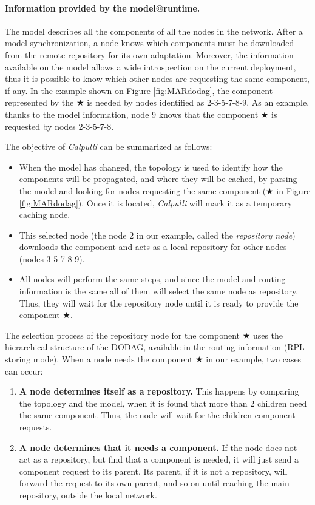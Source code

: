 \paragraph{Information provided by the model@runtime.} The model describes all the components of all the nodes in the network.
After a model synchronization, a node knows which components must be downloaded from the remote repository for its own adaptation.
Moreover, the information available on the model allows a wide introspection on the current deployment, thus it is possible to know which other nodes are requesting the same component, if any.
In the example shown on Figure \ref{fig:MARdodag}, the component represented by the $\bigstar$ is needed by nodes identified as 2-3-5-7-8-9. 
As an example, thanks to the model information, node 9 knows that the component $\bigstar$ is requested by nodes 2-3-5-7-8.

The objective of \emph{Calpulli} can be summarized as follows:
\begin{itemize}
	\item When the model has changed, the topology is used to identify how the components will be propagated, and where they will be cached, by parsing the model and looking for nodes requesting the same component ($\bigstar$ in Figure \ref{fig:MARdodag}).
	Once it is located, \textit{Calpulli} will mark it as a temporary caching node.
	\item This selected node (the node 2 in our example, called the \emph{repository node}) downloads the component and acts as a local repository for other nodes (nodes 3-5-7-8-9).
	\item All nodes will perform the same steps, and since the model and routing information is the same all of them will select the same node as repository.
	Thus, they will wait for the repository node until it is ready to provide the component $\bigstar$.
\end{itemize}

The selection process of the repository node for the component $\bigstar$ uses the hierarchical structure of the DODAG, available in the routing information (RPL storing mode). 
When a node needs the component $\bigstar$ in our example, two cases can occur:

\begin{enumerate}
	\item \textbf{A node determines itself as a repository.} This happens by comparing the topology and the model, when it is found that more than 2 children need the same component.
	Thus, the node will wait for the children component requests.
	\item \textbf{A node determines that it needs a component.} If the node does not act as a repository, but find that a component is needed, it will just send a component request to its parent. Its parent, if it is not a repository, will forward the request to its own parent, and so on until reaching the main repository, outside the local network.
\end{enumerate}

